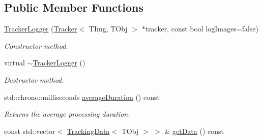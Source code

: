 \subsection*{Public Member Functions}
\begin{DoxyCompactItemize}
\item 
\hypertarget{class_vision_core_1_1_abstractions_1_1_tracker_logger_a00d98127ef543d4faa377076168e9575}{}\hyperlink{class_vision_core_1_1_abstractions_1_1_tracker_logger_a00d98127ef543d4faa377076168e9575}{Tracker\+Logger} (\hyperlink{class_vision_core_1_1_interfaces_1_1_tracker}{Tracker}$<$ T\+Img, T\+Obj $>$ $\ast$tracker, const bool log\+Images=false)\label{class_vision_core_1_1_abstractions_1_1_tracker_logger_a00d98127ef543d4faa377076168e9575}

\begin{DoxyCompactList}\small\item\em Constructor method. \end{DoxyCompactList}\item 
\hypertarget{class_vision_core_1_1_abstractions_1_1_tracker_logger_a515e5ab772202771a2f0d3854dd0669a}{}virtual \hyperlink{class_vision_core_1_1_abstractions_1_1_tracker_logger_a515e5ab772202771a2f0d3854dd0669a}{$\sim$\+Tracker\+Logger} ()\label{class_vision_core_1_1_abstractions_1_1_tracker_logger_a515e5ab772202771a2f0d3854dd0669a}

\begin{DoxyCompactList}\small\item\em Destructor method. \end{DoxyCompactList}\item 
\hypertarget{class_vision_core_1_1_abstractions_1_1_tracker_logger_a19b6ea758a0d8c45cfee3859eb483b67}{}std\+::chrono\+::milliseconds \hyperlink{class_vision_core_1_1_abstractions_1_1_tracker_logger_a19b6ea758a0d8c45cfee3859eb483b67}{average\+Duration} () const \label{class_vision_core_1_1_abstractions_1_1_tracker_logger_a19b6ea758a0d8c45cfee3859eb483b67}

\begin{DoxyCompactList}\small\item\em Returns the average processing duration. \end{DoxyCompactList}\item 
\hypertarget{class_vision_core_1_1_abstractions_1_1_tracker_logger_aa7880b2f2cfb2d3bdd15566a428becff}{}const std\+::vector$<$ \hyperlink{struct_vision_core_1_1_abstractions_1_1_tracking_data}{Tracking\+Data}$<$ T\+Obj $>$ $>$ \& \hyperlink{class_vision_core_1_1_abstractions_1_1_tracker_logger_aa7880b2f2cfb2d3bdd15566a428becff}{get\+Data} () const \label{class_vision_core_1_1_abstractions_1_1_tracker_logger_aa7880b2f2cfb2d3bdd15566a428becff}


\end{DoxyCompactItemize}
